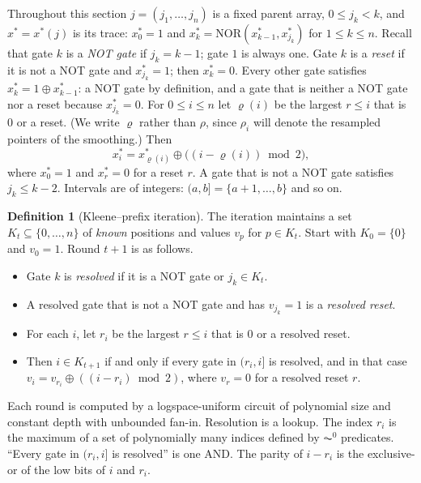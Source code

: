 \documentclass[11pt]{amsart}
\theoremstyle{definition}
\newtheorem{definition}[theorem]{Definition}
\theoremstyle{remark}
\newcommand{\NOR}{\mathrm{NOR}}
\begin{document}
Throughout this section $j=(j_1,\dots,j_n)$ is a fixed parent array,
$0\le j_k<k$, and $x^*=x^*(j)$ is its trace: $x^*_0=1$ and
$x^*_k=\NOR(x^*_{k-1},x^*_{j_k})$ for $1\le k\le n$. Recall that gate $k$ is a
\emph{NOT gate} if $j_k=k-1$; gate $1$ is always one. Gate $k$ is a
\emph{reset} if it is not a NOT gate and $x^*_{j_k}=1$; then $x^*_k=0$. Every
other gate satisfies $x^*_k=1\oplus x^*_{k-1}$: a NOT gate by definition, and a
gate that is neither a NOT gate nor a reset because $x^*_{j_k}=0$. For
$0\le i\le n$ let $\varrho(i)$ be the largest $r\le i$ that is $0$ or a reset.
(We write $\varrho$ rather than $\rho$, since $\rho_i$ will denote the
resampled pointers of the smoothing.) Then
\begin{equation}\label{kp:eq-alternate}
  x^*_i=x^*_{\varrho(i)}\oplus\bigl((i-\varrho(i))\bmod 2\bigr),
\end{equation}
where $x^*_0=1$ and $x^*_r=0$ for a reset $r$.
A gate that is not a NOT gate satisfies $j_k\le k-2$. Intervals are of
integers: $(a,b]=\{a+1,\dots,b\}$ and so on.

\begin{definition}[Kleene--prefix iteration]\label{kp:kleene}
The iteration maintains a set $K_t\subseteq\{0,\dots,n\}$ of \emph{known}
positions and values $v_p$ for $p\in K_t$. Start with $K_0=\{0\}$ and $v_0=1$.
Round $t+1$ is as follows.
\begin{itemize}[leftmargin=2em]
\item Gate $k$ is \emph{resolved} if it is a NOT gate or $j_k\in K_t$.
\item A resolved gate that is not a NOT gate and has $v_{j_k}=1$ is a
  \emph{resolved reset}.
\item For each $i$, let $r_i$ be the largest $r\le i$ that is $0$ or a resolved
  reset.
\item Then $i\in K_{t+1}$ if and only if every gate in $(r_i,i]$ is resolved,
  and in that case $v_i=v_{r_i}\oplus((i-r_i)\bmod 2)$, where $v_r=0$ for a
  resolved reset $r$.
\end{itemize}
\end{definition}

Each round is computed by a logspace-uniform circuit of polynomial size and
constant depth with unbounded fan-in. Resolution is a lookup. The index $r_i$
is the maximum of a set of polynomially many indices defined by $\AC^0$
predicates. ``Every gate in $(r_i,i]$ is resolved'' is one AND. The parity of
$i-r_i$ is the exclusive-or of the low bits of $i$ and $r_i$.
\end{document}
